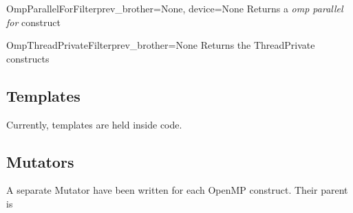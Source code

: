 \documentclass[a4paper,10pt,english]{manual}
\begin{document}
\hypertarget{Backends.CudaBackend.Visitors.CM\_Visitors.OmpParallelForFilter}{}\begin{classdesc}{OmpParallelForFilter}{prev\_brother=None, device=None}
Returns a \emph{omp parallel for} construct
\end{classdesc}

\hypertarget{Backends.CudaBackend.Visitors.CM\_Visitors.OmpThreadPrivateFilter}{}\begin{classdesc}{OmpThreadPrivateFilter}{prev\_brother=None}
Returns the ThreadPrivate constructs
\end{classdesc}


\subsection{Templates}

Currently, templates are held inside  code.


\subsection{Mutators}

A separate Mutator have been written for each OpenMP construct.
Their parent is 
\hypertarget{module-Backends.CudaBackend.Mutators.Common}{}
\modulesynopsis{}
\end{document}
